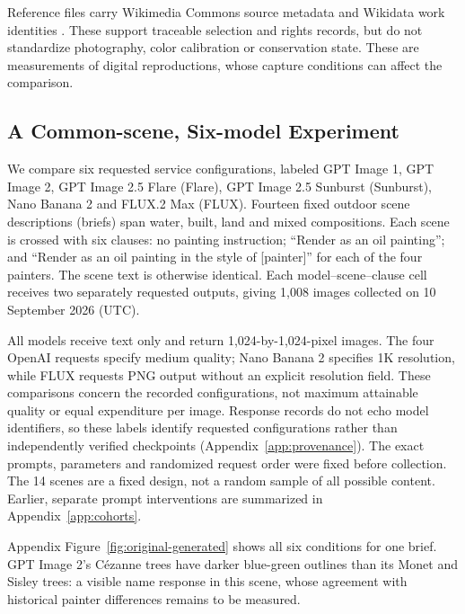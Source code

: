 Reference files carry Wikimedia Commons source metadata and Wikidata work
identities \citep{commonsglam,vrandecic2014wikidata}. These support traceable
selection and rights records, but do not standardize photography, color
calibration or conservation state. These are measurements of digital
reproductions, whose capture conditions can affect the comparison.

\subsection{A Common-scene, Six-model Experiment}
We compare six requested service configurations, labeled GPT Image 1, GPT Image 2, GPT Image 2.5 Flare (Flare),
GPT Image 2.5 Sunburst (Sunburst), Nano Banana 2 and FLUX.2 Max (FLUX).
Fourteen fixed outdoor scene descriptions (briefs) span water,
built, land and mixed compositions. Each scene is crossed with six clauses:
no painting instruction; ``Render as an oil painting''; and ``Render as an oil
painting in the style of [painter]'' for each of the four painters. The scene
text is otherwise identical. Each model--scene--clause cell receives two
separately requested outputs, giving 1,008 images collected on 10 September 2026 (UTC).

All models receive text only and return 1,024-by-1,024-pixel images.
The four OpenAI requests specify medium quality; Nano Banana 2 specifies
1K resolution, while FLUX requests PNG output without an explicit resolution
field. These comparisons concern the recorded
configurations, not maximum attainable quality or equal expenditure per image.
Response records do not echo model identifiers, so these labels identify requested
configurations rather than independently verified checkpoints
(Appendix~\ref{app:provenance}).
The exact prompts, parameters and randomized request order were fixed before
collection. The 14 scenes are a fixed design,
not a random sample of all possible content.
Earlier, separate prompt interventions are summarized in Appendix~\ref{app:cohorts}.

Appendix Figure~\ref{fig:original-generated} shows all six conditions for one brief.
GPT Image 2's C\'ezanne trees have darker blue-green outlines than its Monet
and Sisley trees: a visible name response in this scene, whose agreement with
historical painter differences remains to be measured.



